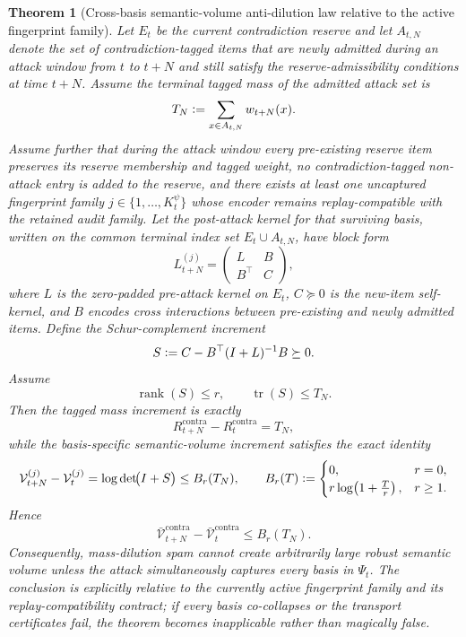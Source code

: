 \documentclass[11pt]{article}
\newtheorem{theorem}{Theorem}[section]
\theoremstyle{definition}
\newcommand{\1}{\mathbf{1}}
\newcommand{\Defeq}{\vcentcolon=}
\begin{document}
\begin{theorem}[Cross-basis semantic-volume anti-dilution law relative to the active fingerprint family]\label{thm:semantic_volume}
Let $E_t$ be the current contradiction reserve and let $A_{t,N}$ denote the set of contradiction-tagged items that are newly admitted during an attack window from $t$ to $t+N$ and still satisfy the reserve-admissibility conditions at time $t+N$. Assume the terminal tagged mass of the admitted attack set is
\[
T_N\Defeq \sum_{x\in A_{t,N}} w_{t+N}(x).
\]
Assume further that during the attack window every pre-existing reserve item preserves its reserve membership and tagged weight, no contradiction-tagged non-attack entry is added to the reserve, and there exists at least one uncaptured fingerprint family $j\in\{1,\dots,K_t^{\psi}\}$ whose encoder remains replay-compatible with the retained audit family. Let the post-attack kernel for that surviving basis, written on the common terminal index set $E_t\cup A_{t,N}$, have block form
\[
L_{t+N}^{(j)}=
\begin{pmatrix}
L & B\\
B^\top & C
\end{pmatrix},
\]
where $L$ is the zero-padded pre-attack kernel on $E_t$, $C\succeq 0$ is the new-item self-kernel, and $B$ encodes cross interactions between pre-existing and newly admitted items. Define the Schur-complement increment
\[
S\Defeq C-B^\top(I+L)^{-1}B\succeq 0.
\]
Assume
\[
\operatorname{rank}(S)\le r,
\qquad
\operatorname{tr}(S)\le T_N.
\]
Then the tagged mass increment is exactly
\[
R_{t+N}^{\mathrm{contra}}-R_t^{\mathrm{contra}}=T_N,
\]
while the basis-specific semantic-volume increment satisfies the exact identity
\[
\mathcal V_{t+N}^{(j)}-\mathcal V_t^{(j)}
=
\log\det\!\bigl(I+S\bigr)
\le
B_r(T_N),
\qquad
B_r(T)\Defeq
\begin{cases}
0, & r=0,\\
r\log\!\left(1+\frac{T}{r}\right), & r\ge 1.
\end{cases}
\]
Hence
\[
\bar{\mathcal V}_{t+N}^{\mathrm{contra}}-\bar{\mathcal V}_t^{\mathrm{contra}}\le B_r(T_N).
\]
Consequently, mass-dilution spam cannot create arbitrarily large robust semantic volume unless the attack simultaneously captures every basis in $\Psi_t$. The conclusion is explicitly relative to the currently active fingerprint family and its replay-compatibility contract; if every basis co-collapses or the transport certificates fail, the theorem becomes inapplicable rather than magically false.
\end{theorem}
\end{document}

